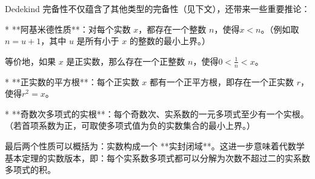 Dedekind 完备性不仅蕴含了其他类型的完备性（见下文），还带来一些重要推论：

* **阿基米德性质**：对每个实数 $x$，都存在一个整数 $n$，使得$x<n$。（例如取 $n=u+1$，其中 $u$ 是所有小于 $x$ 的整数的最小上界。）

  等价地，如果 $x$ 是正实数，那么存在一个正整数 $n$，使得$0<\tfrac{1}{n}<x$。

* **正实数的平方根**：每个正实数 $x$ 都有一个正平方根，即存在一个正实数 $r$，使得$r^{2}=x$。

* **奇数次多项式的实根**：每个奇数次、实系数的一元多项式至少有一个实根。（若首项系数为正，可取使多项式值为负的实数集合的最小上界。）

最后两个性质可以概括为：实数构成一个 **实封闭域**。这进一步意味着代数学基本定理的实数版本，即：每个实系数多项式都可以分解为次数不超过二的实系数多项式的积。
